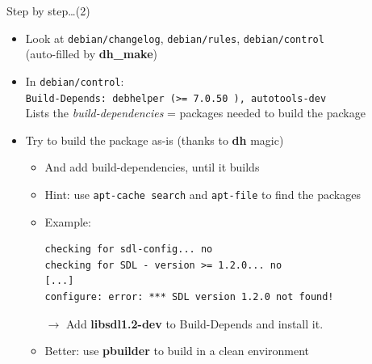 \documentclass[10pt,final]{beamer}
\begin{document}
\begin{frame}[fragile]{Step by step\ldots (2)}
\begin{itemize}
	\item Look at \texttt{debian/changelog}, \texttt{debian/rules}, \texttt{debian/control}\\
		(auto-filled by \textbf{dh\_make})
		\hbr
	\item In \texttt{debian/control}:\\
		\texttt{Build-Depends: debhelper (>= 7.0.50~), autotools-dev}\\
		Lists the \textsl{build-dependencies} = packages needed to build the package
		\hbr
	\item Try to build the package as-is (thanks to \textbf{dh} magic)
		\begin{itemize}
			\item And add build-dependencies, until it builds
			\item Hint: use \texttt{apt-cache search} and \texttt{apt-file} to find the packages
			\item Example:
\begin{lstlisting}[basicstyle=\ttfamily\footnotesize]
checking for sdl-config... no
checking for SDL - version >= 1.2.0... no
[...]
configure: error: *** SDL version 1.2.0 not found!
\end{lstlisting}
$\rightarrow$ Add \textbf{libsdl1.2-dev} to Build-Depends and install it.
		\hbr
	\item Better: use \textbf{pbuilder} to build in a clean environment
		\end{itemize}
\end{itemize}
\end{frame}
\end{document}
